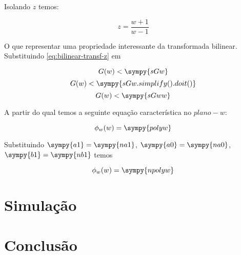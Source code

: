 \documentclass[a4paper,11pt]{article}
\begin{document}
Isolando $z$ temos:

\begin{equation}\label{eq:bilinear-transf-z}
    z = \frac{w+1}{w-1}
\end{equation}

O que representar uma propriedade interessante da transformada bilinear. Substituindo \ref{eq:bilinear-transf-z} em

$$G(w) < \sympy{sGw}$$
$$G(w) < \sympy{sGw.simplify().doit()}$$
$$G(w) < \sympy{sGww}$$

A partir do qual temos a seguinte equação característica no $plano-w$:

$$\phi_w(w) = \sympy{polyw}$$

Substituindo $\sympy{a1} = \sympy{na1}$, $\sympy{a0} = \sympy{na0}$, $\sympy{b1} = \sympy{nb1}$ temos

\begin{equation}
    \phi_w(w) = \sympy{npolyw}
\end{equation}

\section{Simulação}


\section{Conclusão}






\end{document}
